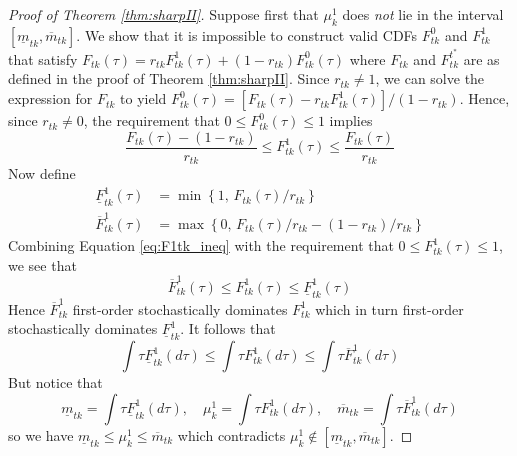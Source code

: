 \begin{proof}[Proof of Theorem \ref{thm:sharpII}]
Suppose first that $\mu^1_{k}$ does \emph{not} lie in the interval $[\underline{m}_{tk}, \overline{m}_{tk}]$.
We show that it is impossible to construct valid CDFs $F^0_{tk}$ and $F^{1}_{tk}$ that satisfy $F_{tk}(\tau) = r_{tk} F^1_{tk}(\tau) + (1 - r_{tk}) F^0_{tk}(\tau)$ where $F_{tk}$ and $F^{t^*}_{tk}$ are as defined in the proof of Theorem \ref{thm:sharpII}.
Since $r_{tk} \neq 1$, we can solve the expression for $F_{tk}$ to yield 
  $F^{0}_{tk}(\tau) = \left[ F_{tk}(\tau) - r_{tk} F^1_{tk}(\tau)\right] / (1 - r_{tk})$.
  Hence, since $r_{tk} \neq 0$, the requirement that $0 \leq F_{tk}^0(\tau) \leq 1$ implies
\begin{equation}
  \frac{F_{tk}(\tau) - (1 - r_{tk})}{r_{tk}} \leq F^{1}_{tk}(\tau) \leq \frac{F_{tk}(\tau)}{r_{tk}}
  \label{eq:F1tk_ineq}
\end{equation}
Now define 
\begin{align*}
  \underline{F}^{1}_{tk}(\tau) &=  \min\left\{ 1,\,  F_{tk}(\tau)/r_{tk} \right\}\\
\overline{F}^{1}_{tk}(\tau) &= \max\left\{ 0,\,  F_{tk}(\tau)/r_{tk} - (1 - r_{tk})/r_{tk} \right\}
\end{align*}
Combining Equation \ref{eq:F1tk_ineq} with the requirement that $0 \leq F^{1}_{tk}(\tau) \leq 1$, we see that
\[
  \overline{F}_{tk}^1(\tau) \leq F^{1}_{tk}(\tau) \leq \underline{F}_{tk}^1(\tau)
\]
Hence $\overline{F}^1_{tk}$ first-order stochastically dominates $F^{1}_{tk}$ which in turn first-order stochastically dominates $\underline{F}_{tk}^1$. 
It follows that
\[
 \int \tau \underline{F}_{tk}^1(d\tau) \leq \int \tau F^{1}_{tk}(d\tau) \leq \int \tau\overline{F}_{tk}^1(d\tau)
\]
But notice that 
\[
  \underline{m}_{tk} = \int \tau \underline{F}_{tk}^1(d\tau), \quad 
  \mu^1_{k} = \int \tau F^{1}_{tk}(d\tau), \quad 
  \overline{m}_{tk} = \int \tau\overline{F}_{tk}^1(d\tau)
\]
so we have $\underline{m}_{tk} \leq \mu^1_{k} \leq \overline{m}_{tk}$ which contradicts $\mu^1_{k} \notin [\underline{m}_{tk}, \overline{m}_{tk}]$.


\end{proof}
